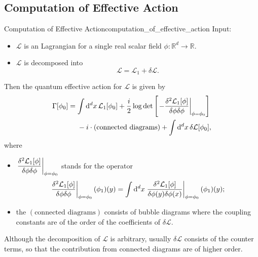 \documentclass{article}
\begin{document}
\subsection{Computation of Effective Action}

\begin{theorem}{Computation of Effective Action}{computation_of_effective_action}
    Input:
    \begin{itemize}
        \item $\mathcal{L}$ is an Lagrangian for a single real scalar field $\phi: \mathbb{R}^d \rightarrow \mathbb{R}$.
        \item $\mathcal{L}$ is decomposed into
        \[ \mathcal{L} = \mathcal{L}_1 + \delta \mathcal{L}. \]
    \end{itemize}
    Then the quantum effective action for $\mathcal{L}$ is given by
    \begin{align*}
        \Gamma[\phi_{0}] &= \int \dd{^d x} \mathcal{L}_1[\phi_{0}] + \frac{i}{2} \log \det \qty[\eval{-\frac{\delta^2 \mathcal{L}_1[\phi]}{\delta \phi \delta \phi}}_{\phi=\phi_0}] \\
        &{\phantom{{}={}}} - i\cdot(\text{connected diagrams}) + \int \dd{^d x} \delta\mathcal{L}[\phi_{0}],
    \end{align*}
    where
    \begin{itemize}
        \item $\displaystyle \eval{\frac{\delta^2 \mathcal{L}_1[\phi]}{\delta \phi \delta \phi}}_{\phi=\phi_0}$ stands for the operator
        \[ \eval{\frac{\delta^2 \mathcal{L}_1[\phi]}{\delta \phi \delta \phi}}_{\phi=\phi_0}(\phi_1)(y) = \int \dd{^d x} \eval{\frac{\delta^2 \mathcal{L}_1[\phi]}{\delta \phi(y) \delta \phi(x)}}_{\phi=\phi_0}(\phi_1)(y); \]
        \item the $(\text{connected diagrams})$ consists of bubble diagrams where the coupling constants are of the order of the coefficients of $\delta \mathcal{L}$.
    \end{itemize}
\end{theorem}

Although the decomposition of $\mathcal{L}$ is arbitrary, usually $\delta \mathcal{L}$ consists of the counter terms, so that the contribution from connected diagrams are of higher order.
\end{document}
